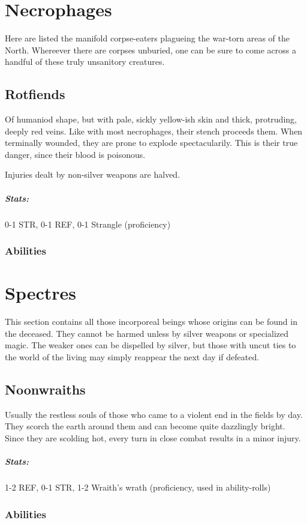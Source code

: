 \section{Necrophages}
Here are listed the manifold corpse-eaters plagueing the war-torn areas of the North. Whereever there
are corpses unburied, one can be sure to come across a handful of these truly unsanitory creatures.

\subsection{Rotfiends}
Of humaniod shape, but with pale, sickly yellow-ish skin and thick, protruding, deeply red veins. Like
with most necrophages, their stench proceeds them. When terminally wounded, they are prone to explode
spectacularily. This is their true danger, since their blood is poisonous.

Injuries dealt by non-silver weapons are halved.

\subparagraph{Stats:}
0-1 STR, 0-1 REF, 0-1 Strangle (proficiency)

\subsubsection{Abilities}


\section{Spectres}\label{monster:spectre}
This section contains all those incorporeal beings whose origins can be found in the deceased. They cannot be
harmed unless by silver weapons or specialized magic. The weaker ones can be dispelled by silver, but those
with uncut ties to the world of the living may simply reappear the next day if defeated.

\subsection{Noonwraiths}
Usually the restless souls of those who came to a violent end in the fields by day. They scorch the earth around them
and can become quite dazzlingly bright. Since they are scolding hot, every turn in close combat results in a minor injury.

\subparagraph{Stats:}
1-2 REF, 0-1 STR, 1-2 Wraith's wrath (proficiency, used in ability-rolls)

\subsubsection{Abilities}

